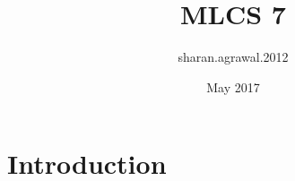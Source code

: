 \documentclass{article}
\title{MLCS 7}
\author{sharan.agrawal.2012 }
\date{May 2017}
\begin{document}
\maketitle

\section{Introduction}
\end{document}

